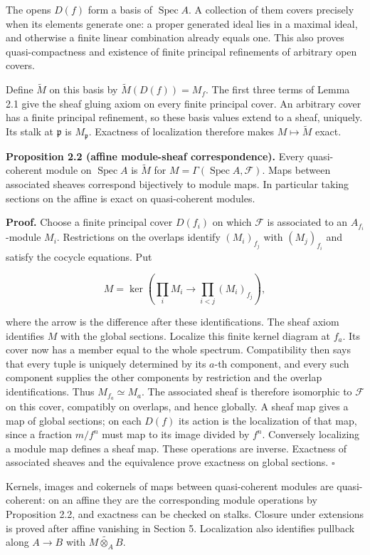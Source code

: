 \documentclass[11pt,a4paper,openany]{report}
\begin{document}
The opens \(D(f)\) form a basis of \(\operatorname{Spec}A\). A collection of them covers precisely when its elements generate one: a proper generated ideal lies in a maximal ideal, and otherwise a finite linear combination already equals one. This also proves quasi-compactness and existence of finite principal refinements of arbitrary open covers.

Define \(\widetilde M\) on this basis by \(\widetilde M(D(f))=M_f\). The first three terms of Lemma 2.1 give the sheaf gluing axiom on every finite principal cover. An arbitrary cover has a finite principal refinement, so these basis values extend to a sheaf, uniquely. Its stalk at \(\mathfrak p\) is \(M_{\mathfrak p}\). Exactness of localization therefore makes \(M\mapsto\widetilde M\) exact.

\textbf{Proposition 2.2 (affine module-sheaf correspondence).} Every quasi-coherent module on \(\operatorname{Spec}A\) is \(\widetilde M\) for \(M=\Gamma(\operatorname{Spec}A,\mathcal F)\). Maps between associated sheaves correspond bijectively to module maps. In particular taking sections on the affine is exact on quasi-coherent modules.

\textbf{Proof.} Choose a finite principal cover \(D(f_i)\) on which \(\mathcal F\) is associated to an \(A_{f_i}\)-module \(M_i\). Restrictions on the overlaps identify \((M_i)_{f_j}\) with \((M_j)_{f_i}\) and satisfy the cocycle equations. Put

\[
M=\ker\left(\prod_i M_i\longrightarrow\prod_{i<j}(M_i)_{f_j}\right),
\]

where the arrow is the difference after these identifications. The sheaf axiom identifies \(M\) with the global sections. Localize this finite kernel diagram at \(f_a\). Its cover now has a member equal to the whole spectrum. Compatibility then says that every tuple is uniquely determined by its \(a\)-th component, and every such component supplies the other components by restriction and the overlap identifications. Thus \(M_{f_a}\simeq M_a\). The associated sheaf is therefore isomorphic to \(\mathcal F\) on this cover, compatibly on overlaps, and hence globally. A sheaf map gives a map of global sections; on each \(D(f)\) its action is the localization of that map, since a fraction \(m/f^n\) must map to its image divided by \(f^n\). Conversely localizing a module map defines a sheaf map. These operations are inverse. Exactness of associated sheaves and the equivalence prove exactness on global sections. \(\square\)

Kernels, images and cokernels of maps between quasi-coherent modules are quasi-coherent: on an affine they are the corresponding module operations by Proposition 2.2, and exactness can be checked on stalks. Closure under extensions is proved after affine vanishing in Section 5. Localization also identifies pullback along \(A\to B\) with \(\widetilde{M\otimes_A B}\).
\end{document}
